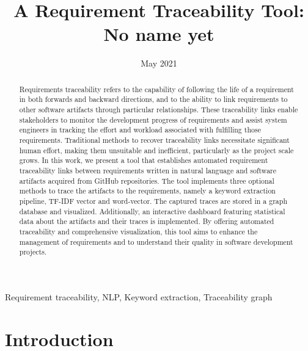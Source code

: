 \documentclass[conference]{IEEEtran}
\begin{document}
\title{A Requirement Traceability Tool: No name yet}
\author{
}

\date{May 2021}

\maketitle
\begin{abstract}
    Requirements traceability refers to the capability of following the life of a requirement in both forwards and backward directions, and to the ability to link requirements to other software artifacts through particular relationships. These traceability links enable stakeholders to monitor the development progress of requirements and assist system engineers in tracking the effort and workload associated with fulfilling those requirements. Traditional methods to recover traceability links necessitate significant human effort, making them unsuitable and inefficient, particularly as the project scale grows. In this work, we present a tool that establishes automated requirement traceability links between requirements written in natural language and software artifacts acquired from GitHub repositories. The tool implements three optional methods to trace the artifacts to the requirements, namely a keyword extraction pipeline, TF-IDF vector and word-vector. The captured traces are stored in a graph database and visualized. Additionally, an interactive dashboard featuring statistical data about the artifacts and their traces is implemented. By offering automated traceability and comprehensive visualization, this tool aims to enhance the management of requirements and to understand their quality in software development projects.
\end{abstract}
\begin{IEEEkeywords}
Requirement traceability, NLP, Keyword extraction, Traceability graph
\end{IEEEkeywords}

\section{Introduction} \label{section:introduction}
\end{document}
